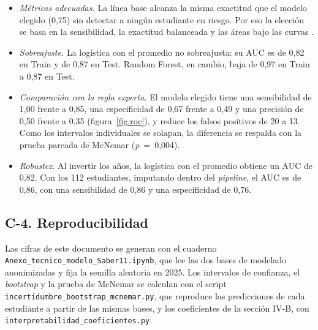 \documentclass[10pt,letterpaper,twocolumn]{article}
\newcommand{\parencite}{\citep}
\begin{document}
\begin{itemize}
    \item \textit{Métricas adecuadas.} La línea base alcanza la misma exactitud que el modelo elegido (0,75) sin detectar a ningún estudiante en riesgo. Por eso la elección se basa en la sensibilidad, la exactitud balanceada y las áreas bajo las curvas \parencite{saito2015precision}.
    \item \textit{Sobreajuste.} La logística con el promedio no sobreajusta: su AUC es de 0,82 en Train y de 0,87 en Test. Random Forest, en cambio, baja de 0,97 en Train a 0,87 en Test.
    \item \textit{Comparación con la regla experta.} El modelo elegido tiene una sensibilidad de 1,00 frente a 0,85, una especificidad de 0,67 frente a 0,49 y una precisión de 0,50 frente a 0,35 (figura~\ref{fig:roc}), y reduce los falsos positivos de 20 a 13. Como los intervalos individuales se solapan, la diferencia se respalda con la prueba pareada de McNemar (\textit{p}~=~0,004).
    \item \textit{Robustez.} Al invertir los años, la logística con el promedio obtiene un AUC de 0,82. Con los 112 estudiantes, imputando dentro del \textit{pipeline}, el AUC es de 0,86, con una sensibilidad de 0,86 y una especificidad de 0,76.
\end{itemize}

\subsection*{C-4. Reproducibilidad}

Las cifras de este documento se generan con el cuaderno \texttt{Anexo\_tecnico\_modelo\_Saber11.ipynb}, que lee las dos bases de modelado anonimizadas y fija la semilla aleatoria en 2025. Los intervalos de confianza, el \textit{bootstrap} y la prueba de McNemar se calculan con el script \texttt{incertidumbre\_bootstrap\_mcnemar.py}, que reproduce las predicciones de cada estudiante a partir de las mismas bases, y los coeficientes de la sección IV-B, con \texttt{interpretabilidad\_coeficientes.py}.
\end{document}
